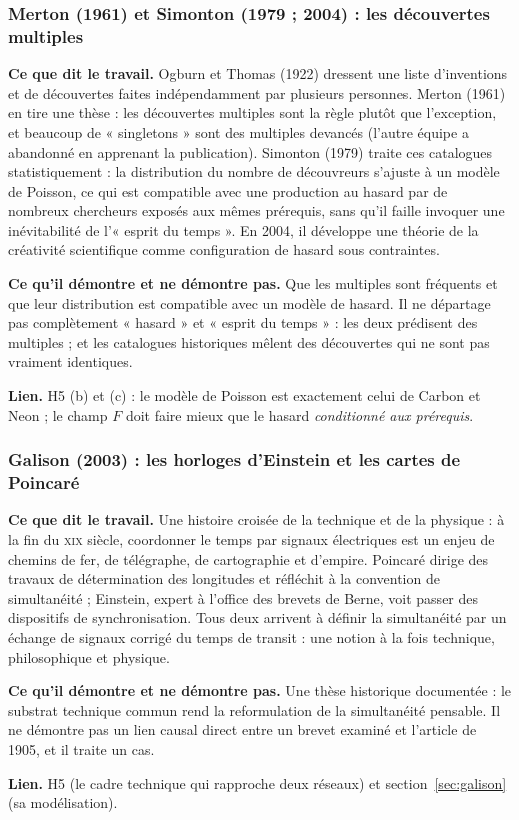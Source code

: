 \documentclass[a4paper,11pt]{article}
\newcommand{\cours}[1]{\par\smallskip\textbf{\textsf{#1}}\enspace}
\begin{document}
\subsubsection{Merton (1961) et Simonton (1979 ; 2004) : les découvertes multiples}
\cours{Ce que dit le travail.} Ogburn et Thomas (1922) dressent une liste d'inventions et de découvertes faites indépendamment par plusieurs personnes. Merton (1961) en tire une thèse : les découvertes multiples sont la règle plutôt que l'exception, et beaucoup de « singletons » sont des multiples devancés (l'autre équipe a abandonné en apprenant la publication). Simonton (1979) traite ces catalogues statistiquement : la distribution du nombre de découvreurs s'ajuste à un modèle de Poisson, ce qui est compatible avec une production au hasard par de nombreux chercheurs exposés aux mêmes prérequis, sans qu'il faille invoquer une inévitabilité de l'« esprit du temps ». En 2004, il développe une théorie de la créativité scientifique comme configuration de hasard sous contraintes.
\cours{Ce qu'il démontre et ne démontre pas.} Que les multiples sont fréquents et que leur distribution est compatible avec un modèle de hasard. Il ne départage pas complètement « hasard » et « esprit du temps » : les deux prédisent des multiples ; et les catalogues historiques mêlent des découvertes qui ne sont pas vraiment identiques.
\cours{Lien.} H5 (b) et (c) : le modèle de Poisson est exactement celui de Carbon et Neon ; le champ $F$ doit faire mieux que le hasard \emph{conditionné aux prérequis}.

\subsubsection{Galison (2003) : les horloges d'Einstein et les cartes de Poincaré}
\cours{Ce que dit le travail.} Une histoire croisée de la technique et de la physique : à la fin du \textsc{xix}\ieme{} siècle, coordonner le temps par signaux électriques est un enjeu de chemins de fer, de télégraphe, de cartographie et d'empire. Poincaré dirige des travaux de détermination des longitudes et réfléchit à la convention de simultanéité ; Einstein, expert à l'office des brevets de Berne, voit passer des dispositifs de synchronisation. Tous deux arrivent à définir la simultanéité par un échange de signaux corrigé du temps de transit : une notion à la fois technique, philosophique et physique.
\cours{Ce qu'il démontre et ne démontre pas.} Une thèse historique documentée : le substrat technique commun rend la reformulation de la simultanéité pensable. Il ne démontre pas un lien causal direct entre un brevet examiné et l'article de 1905, et il traite un cas.
\cours{Lien.} H5 (le cadre technique qui rapproche deux réseaux) et section~\ref{sec:galison} (sa modélisation).
\end{document}
